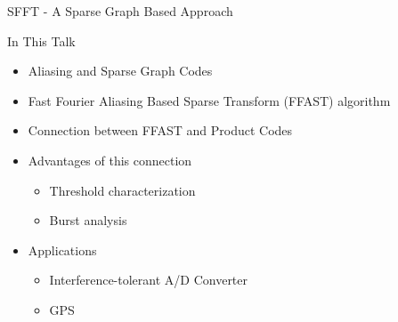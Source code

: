 \documentclass[10pt,xcolor=table]{beamer}
\begin{document}
	\begin{frame}{SFFT - A Sparse Graph Based Approach}
		\begin{block}{In This Talk}
			\begin{itemize}
				\item Aliasing and Sparse Graph Codes
				\item \alert{F}ast \alert{F}ourier \alert{A}liasing Based \alert{S}parse \alert{T}ransform (\alert{FFAST}) algorithm
				\item Connection between FFAST and Product Codes
				\item Advantages of this connection
				    \begin{itemize}
					\item Threshold characterization
					\item Burst analysis
		     		\end{itemize}
				\item Applications
			    	\begin{itemize}
					\item Interference-tolerant A/D Converter
					\item GPS
				    \end{itemize}			
			\end{itemize}
		\end{block}
		
	\end{frame}
\end{document}
